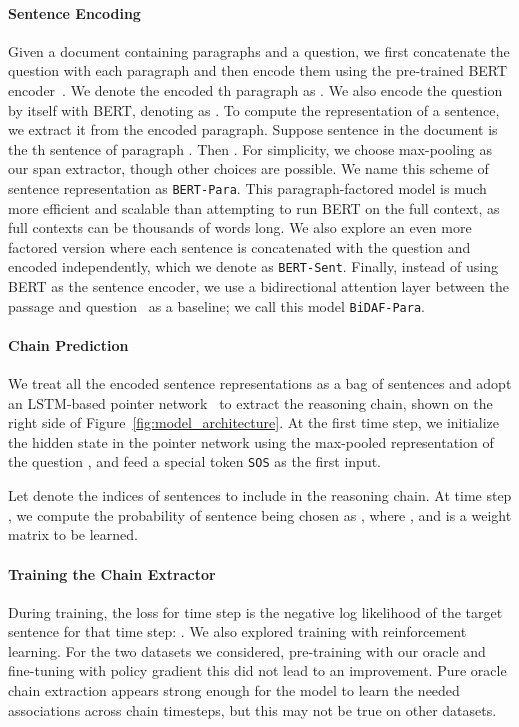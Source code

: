 \documentclass[11pt,a4paper]{article}
\begin{document}
\paragraph{Sentence Encoding}
Given a document containing  paragraphs and a question, we first concatenate the question with each paragraph and then encode them using the pre-trained BERT encoder~\citep{devlin2018bert}. We denote the encoded th paragraph as . We also encode the question by itself with BERT, denoting as . To compute the representation of a sentence, we extract it from the encoded paragraph. Suppose sentence  in the document is the th sentence of paragraph . Then . For simplicity, we choose max-pooling as our span extractor, though other choices are possible. We name this scheme of sentence representation as \texttt{BERT-Para}. This paragraph-factored model is much more efficient and scalable than attempting to run BERT on the full context, as full contexts can be thousands of words long. We also explore an even more factored version where each sentence is concatenated with the question and encoded independently, which we denote as \texttt{BERT-Sent}. Finally, instead of using BERT as the sentence encoder, we use a bidirectional attention layer between the passage and question~\citep{seo2016bidirectional} as a baseline; we call this model \texttt{BiDAF-Para}.

\paragraph{Chain Prediction}
We treat all the encoded sentence representations as a bag of sentences and adopt an LSTM-based pointer network~\citep{vinyals2015pointer} to extract the reasoning chain, shown on the right side of Figure~\ref{fig:model_architecture}. At the first time step, we initialize the hidden state  in the pointer network using the max-pooled representation of the question , and feed a special token \texttt{SOS} as the first input.

Let  denote the indices of sentences to include in the reasoning chain. At time step , we compute the probability of sentence  being chosen as , where , and  is a weight matrix to be learned.



\paragraph{Training the Chain Extractor} During training, the loss for time step  is the negative log likelihood of the target sentence  for that time step: . We also explored training with reinforcement learning. For the two datasets we considered, pre-training with our oracle and fine-tuning with policy gradient this did not lead to an improvement. Pure oracle chain extraction appears strong enough for the model to learn the needed associations across chain timesteps, but this may not be true on other datasets.
\end{document}
